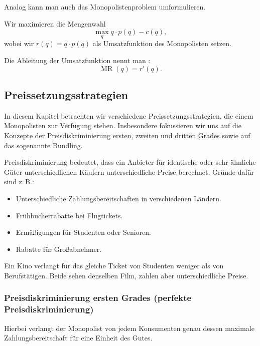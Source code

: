 Analog kann man auch das Monopolistenproblem umformulieren.

\begin{construction}
	Wir maximieren die Mengenwahl
	\[
		\max_q q \cdot p(q) - c(q)
		,\]
	wobei wir $r(q) = q \cdot p(q)$ als Umsatzfunktion des Monopolisten setzen.
\end{construction}

\begin{definition}
	Die Ableitung der Umsatzfunktion nennt man :
	\[
		\operatorname{MR}(q)  = r'(q)
		.\]
\end{definition}




\subsection{Preissetzungsstrategien}

In diesem Kapitel betrachten wir verschiedene Preissetzungsstrategien, die einem Monopolisten zur Verfügung stehen. Insbesondere fokussieren wir uns auf die Konzepte der Preisdiskriminierung ersten, zweiten und dritten Grades sowie auf das sogenannte Bundling.

Preisdiskriminierung bedeutet, dass ein Anbieter für identische oder sehr ähnliche Güter unterschiedlichen Käufern unterschiedliche Preise berechnet. Gründe dafür sind z.\,B.:

\begin{itemize}
    \item Unterschiedliche Zahlungsbereitschaften in verschiedenen Ländern.
    \item Frühbucherrabatte bei Flugtickets.
    \item Ermäßigungen für Studenten oder Senioren.
    \item Rabatte für Großabnehmer.
\end{itemize}

\begin{example}
Ein Kino verlangt für das gleiche Ticket von Studenten weniger als von Berufstätigen. Beide sehen denselben Film, zahlen aber unterschiedliche Preise.
\end{example}


\subsubsection{Preisdiskriminierung ersten Grades (perfekte Preisdiskriminierung)}
Hierbei verlangt der Monopolist von jedem Konsumenten genau dessen maximale Zahlungsbereitschaft für eine Einheit des Gutes.

